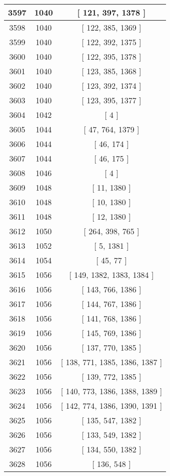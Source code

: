 \begin{center}
\begin{longtable}[H]{|| c c c ||}
\hline
3597 & 1040 & [ 121, 397, 1378 ] \\ 
\hline
3598 & 1040 & [ 122, 385, 1369 ] \\ 
\hline
3599 & 1040 & [ 122, 392, 1375 ] \\ 
\hline
3600 & 1040 & [ 122, 395, 1378 ] \\ 
\hline
3601 & 1040 & [ 123, 385, 1368 ] \\ 
\hline
3602 & 1040 & [ 123, 392, 1374 ] \\ 
\hline
3603 & 1040 & [ 123, 395, 1377 ] \\ 
\hline
3604 & 1042 & [ 4 ] \\ 
\hline
3605 & 1044 & [ 47, 764, 1379 ] \\ 
\hline
3606 & 1044 & [ 46, 174 ] \\ 
\hline
3607 & 1044 & [ 46, 175 ] \\ 
\hline
3608 & 1046 & [ 4 ] \\ 
\hline
3609 & 1048 & [ 11, 1380 ] \\ 
\hline
3610 & 1048 & [ 10, 1380 ] \\ 
\hline
3611 & 1048 & [ 12, 1380 ] \\ 
\hline
3612 & 1050 & [ 264, 398, 765 ] \\ 
\hline
3613 & 1052 & [ 5, 1381 ] \\ 
\hline
3614 & 1054 & [ 45, 77 ] \\ 
\hline
3615 & 1056 & [ 149, 1382, 1383, 1384 ] \\ 
\hline
3616 & 1056 & [ 143, 766, 1386 ] \\ 
\hline
3617 & 1056 & [ 144, 767, 1386 ] \\ 
\hline
3618 & 1056 & [ 141, 768, 1386 ] \\ 
\hline
3619 & 1056 & [ 145, 769, 1386 ] \\ 
\hline
3620 & 1056 & [ 137, 770, 1385 ] \\ 
\hline
3621 & 1056 & [ 138, 771, 1385, 1386, 1387 ] \\ 
\hline
3622 & 1056 & [ 139, 772, 1385 ] \\ 
\hline
3623 & 1056 & [ 140, 773, 1386, 1388, 1389 ] \\ 
\hline
3624 & 1056 & [ 142, 774, 1386, 1390, 1391 ] \\ 
\hline
3625 & 1056 & [ 135, 547, 1382 ] \\ 
\hline
3626 & 1056 & [ 133, 549, 1382 ] \\ 
\hline
3627 & 1056 & [ 134, 550, 1382 ] \\ 
\hline
3628 & 1056 & [ 136, 548 ] \\ 

\end{longtable}
\end{center}
